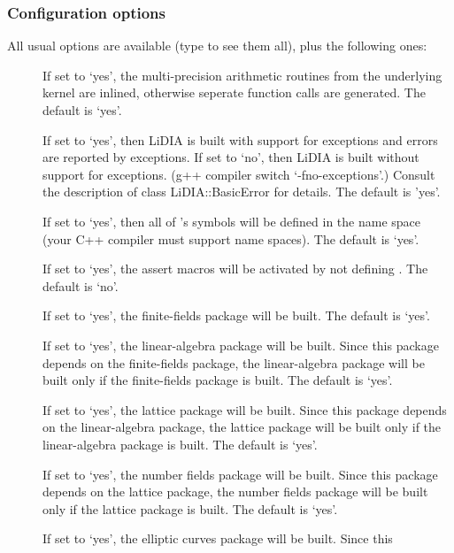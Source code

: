 \subsubsection{Configuration options}
All usual  options are available (type  to see them all), plus the following ones:
\begin{description}
\item[]
  If set to `yes', the multi-precision arithmetic routines from the
  underlying kernel are inlined, otherwise seperate function calls
  are generated.  The default is `yes'.
\item[] 
  If set to `yes', then LiDIA is built with support for
  exceptions and errors are reported by exceptions. 
  If set to `no', then LiDIA is built without support for
  exceptions. (g++ compiler switch `-fno-exceptions'.) 
  Consult the description of class LiDIA::BasicError for details.
  The default is 'yes'.
\item[]
  If set to `yes', then all of \LiDIA's symbols will be defined in the name
  space  (your C++ compiler must support name spaces).  The
  default is `yes'.
\item[]
  If set to `yes', the assert macros will be activated by not defining
  .  The default is `no'.
\item[]
  If set to `yes', the finite-fields package will be built.  The default is
  `yes'.
\item[]
  If set to `yes', the linear-algebra package will be built.  Since this
  package depends on the finite-fields package, the linear-algebra package
  will be built only if the finite-fields package is built.  The default is
  `yes'.
\item[]
  If set to `yes', the lattice package will be built.  Since this package
  depends on the linear-algebra package, the lattice package will be built
  only if the linear-algebra package is built.  The default is `yes'.
\item[]
  If set to `yes', the number fields package will be built.  Since this
  package depends on the lattice package, the number fields package will be
  built only if the lattice package is built.  The default is `yes'.
\item[]
  If set to `yes', the elliptic curves package will be built.  Since this

\end{description}
